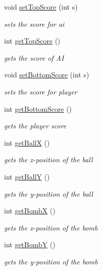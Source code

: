 \begin{DoxyCompactItemize}
void \hyperlink{classview_1_1_pong_game_display_a04bcc8b60d85f38178d2cd817e3fbd39}{set\+Top\+Score} (int s)
\begin{DoxyCompactList}\small\item\em sets the score for ai \end{DoxyCompactList}\item 
int \hyperlink{classview_1_1_pong_game_display_a4a5b6bbbf9156076f5e683954b315603}{get\+Top\+Score} ()
\begin{DoxyCompactList}\small\item\em gets the score of AI \end{DoxyCompactList}\item 
void \hyperlink{classview_1_1_pong_game_display_aa1ef677f1bae92a51750732099b1609a}{set\+Bottom\+Score} (int s)
\begin{DoxyCompactList}\small\item\em sets the score for player \end{DoxyCompactList}\item 
int \hyperlink{classview_1_1_pong_game_display_a11b19810a46fa40aa6913ccaf7a8e2ff}{get\+Bottom\+Score} ()
\begin{DoxyCompactList}\small\item\em gets the player score \end{DoxyCompactList}\item 
int \hyperlink{classview_1_1_pong_game_display_a83584a112f5bd8877e1bbb1d74dfa080}{get\+BallX} ()
\begin{DoxyCompactList}\small\item\em gets the x-\/position of the ball \end{DoxyCompactList}\item 
int \hyperlink{classview_1_1_pong_game_display_a940198a68c987548b182d18069ba5885}{get\+BallY} ()
\begin{DoxyCompactList}\small\item\em gets the y-\/position of the ball \end{DoxyCompactList}\item 
int \hyperlink{classview_1_1_pong_game_display_a58685c652c4f3a3d7aa0c20c19ed4b11}{get\+BombX} ()
\begin{DoxyCompactList}\small\item\em gets the x-\/position of the bomb \end{DoxyCompactList}\item 
int \hyperlink{classview_1_1_pong_game_display_a6a8f4aa57bd1601d8a1d51eb767f0b2a}{get\+BombY} ()
\begin{DoxyCompactList}\small\item\em gets the y-\/position of the bomb \end{DoxyCompactList}\item 

\end{DoxyCompactItemize}

